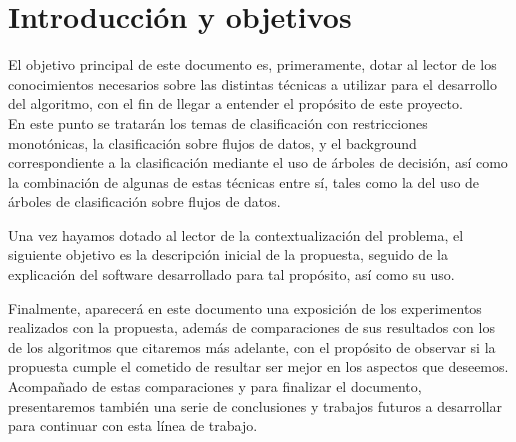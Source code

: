 \chapter[Capítulo 1. Introducción y objetivos]{Introducción y objetivos}

El objetivo principal de este documento es, primeramente, dotar al lector de los conocimientos necesarios sobre las distintas técnicas a utilizar para el desarrollo del algoritmo, con el fin de llegar a entender el propósito de este proyecto.\\
En este punto se tratarán los temas de clasificación con restricciones monotónicas, la clasificación sobre flujos de datos, y el background correspondiente a la clasificación mediante el uso de árboles de decisión, así como la combinación de algunas de estas técnicas entre sí, tales como la del uso de árboles de clasificación sobre flujos de datos.

Una vez hayamos dotado al lector de la contextualización del problema, el siguiente objetivo es la descripción inicial de la propuesta, seguido de la explicación del software desarrollado para tal propósito, así como su uso.

Finalmente, aparecerá en este documento una exposición de los experimentos realizados con la propuesta, además de comparaciones de sus resultados con los de los algoritmos que citaremos más adelante, con el propósito de observar si la propuesta cumple el cometido de resultar ser mejor en los aspectos que deseemos.\\
Acompañado de estas comparaciones y para finalizar el documento, presentaremos también una serie de conclusiones y trabajos futuros a desarrollar para continuar con esta línea de trabajo.

\newpage


